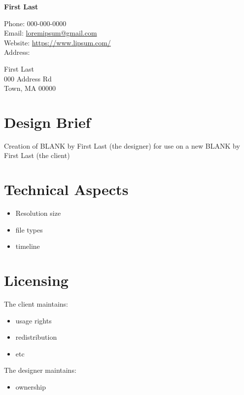 \documentclass[12pt]{article} %
\begin{document}
{\LARGE\bfseries First Last} %

Phone: 000-000-0000\\ %
Email: \href{mailto:loremipsum@gmail.com}{loremipsum@gmail.com}\\ %
Website: \href{https://www.lipsum.com/}{https://www.lipsum.com/}\\ %
Address: \\

{\addtolength{\leftskip}{5mm}

First Last \\
000 Address Rd \\
Town, MA 00000}

\section*{Design Brief}

Creation of BLANK by First Last (the designer) for use on a new
BLANK by First Last (the client)

\section*{Technical Aspects}

\begin{itemize} [noitemsep,topsep=0pt]
\item Resolution size
  \item file types
  \item timeline
  \\
\end{itemize}

\section*{Licensing}

The client maintains:
\begin{itemize} [noitemsep,topsep=0pt]
\item  usage rights
\item redistribution
\item etc
  \\
\end{itemize}


The designer maintains:
\begin{itemize} [noitemsep,topsep=0pt]
\item ownership
  \\
\end{itemize}
\end{document}
